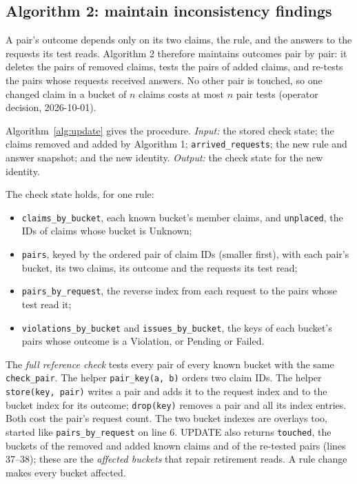 \documentclass[11pt]{article}
\newcommand{\code}[1]{\texttt{#1}}
\begin{document}
\subsection{Algorithm 2: maintain inconsistency findings}

A pair's outcome depends only on its two claims, the rule, and the answers to
the requests its test reads. Algorithm 2 therefore maintains outcomes pair by
pair: it deletes the pairs of removed claims, tests the pairs of added claims,
and re-tests the pairs whose requests received answers. No other pair is
touched, so one changed claim in a bucket of $n$ claims costs at most $n$ pair
tests (operator decision, 2026-10-01).

Algorithm~\ref{alg:update} gives the procedure. \textit{Input:} the stored
check state; the claims removed and added by Algorithm 1;
\code{arrived\_requests}; the new rule and answer snapshot; and the new
identity. \textit{Output:} the check state for the new identity.

The check state holds, for one rule:
\begin{itemize}
\setlength{\itemsep}{0pt}
\item \code{claims\_by\_bucket}, each known bucket's member claims, and
  \code{unplaced}, the IDs of claims whose bucket is Unknown;
\item \code{pairs}, keyed by the ordered pair of claim IDs (smaller first), with
  each pair's bucket, its two claims, its outcome and the requests its test
  read;
\item \code{pairs\_by\_request}, the reverse index from each request to the
  pairs whose test read it;
\item \code{violations\_by\_bucket} and \code{issues\_by\_bucket}, the keys of
  each bucket's pairs whose outcome is a Violation, or Pending or Failed.
\end{itemize}
The \emph{full reference check} tests every pair of every known bucket with the
same \code{check\_pair}. The helper \code{pair\_key(a, b)} orders two claim
IDs. The helper \code{store(key, pair)} writes a pair and adds it to the request index
and to the bucket index for its outcome; \code{drop(key)} removes a pair and
all its index entries. Both cost the pair's request count. The two bucket
indexes are overlays too, started like \code{pairs\_by\_request} on line 6.
UPDATE also returns \code{touched}, the buckets of the removed and added known
claims and of the re-tested pairs (lines 37--38); these are the \emph{affected
buckets} that repair retirement reads. A rule change makes every bucket
affected.
\end{document}
